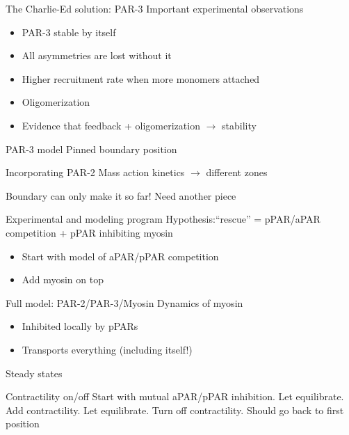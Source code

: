 \documentclass{beamer}
\newcommand{\6}[1]{#1_{\text{6}}}
\newcommand{\3}[1]{#1_{\text{3}}}
\begin{document}
\begin{frame}{The Charlie-Ed solution: PAR-3}
Important experimental observations
\begin{itemize}
\item PAR-3 stable by itself
\item All asymmetries are lost without it
\item Higher recruitment rate when more monomers attached
\item Oligomerization
\item Evidence that feedback + oligomerization $\rightarrow$ stability
\end{itemize}
\end{frame}

\begin{frame}{PAR-3 model}
Pinned boundary position
\end{frame}

\begin{frame}{Incorporating PAR-2}
Mass action kinetics $\rightarrow$ different zones

Boundary can only make it so far! Need another piece
\end{frame}

\begin{frame}{Experimental and modeling program}
Hypothesis:``rescue'' = pPAR/aPAR competition + pPAR inhibiting myosin 
\begin{itemize}
\item Start with model of aPAR/pPAR competition
\item Add myosin on top
\end{itemize}
\end{frame}

\begin{frame}{Full model: PAR-2/PAR-3/Myosin}
Dynamics of myosin
\begin{itemize}
\item Inhibited locally by pPARs
\item Transports everything (including itself!)
\end{itemize}
\end{frame}

\begin{frame}{Steady states}
\end{frame}

\begin{frame}{Contractility on/off}
Start with mutual aPAR/pPAR inhibition. Let equilibrate. Add contractility. Let equilibrate. Turn off contractility. Should go back to first position
\end{frame}
\end{document}
